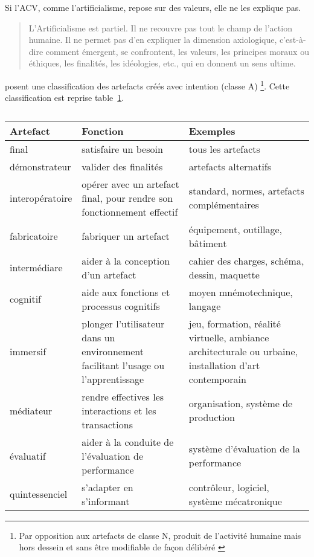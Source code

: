Si l'\gls{ACV}, comme l'artificialisme, repose sur des valeurs, elle ne les explique pas.
\blockcquote[chapitre 3, p.51 3.4 Propositions clefs de l'Artificialisme]{micaelli_artificialisme:_2003}{
L'Artificialisme est partiel.
Il ne recouvre pas tout le champ de l'action humaine.
Il ne permet pas d'en expliquer la dimension axiologique, c'est-à-dire comment émergent, se confrontent, les valeurs, les principes moraux ou éthiques, les finalités, les idéologies, etc., qui en donnent un sens ultime.
}

\citeauthor{micaelli_artificialisme:_2003} posent une classification des artefacts créés avec intention (classe A)
\footnote{Par opposition aux artefacts de classe N, produit de l'activité humaine mais hors dessein et sans être modifiable de façon délibéré \cite[p.55 Chapitre 4]{micaelli_artificialisme:_2003}}.
Cette classification est reprise table~\ref{tab:artefactsdeclasseA}.
\begin{table}
	\centering
	\begin{tabular}{l|p{4.5cm}|p{4.5cm}}
		Artefact & Fonction & Exemples \\
		\hline
		final & satisfaire un besoin & tous les artefacts \\
		démonstrateur & valider des finalités & artefacts alternatifs \\
		interopératoire & opérer avec un artefact final, pour rendre son fonctionnement effectif & standard, normes, artefacts complémentaires \\
		fabricatoire & fabriquer un artefact & équipement, outillage, bâtiment \\
		intermédiare & aider à la conception d'un artefact & cahier des charges, schéma, dessin, maquette \\
		cognitif & aide aux fonctions et processus cognitifs & moyen mnémotechnique, langage \\
		immersif & plonger l'utilisateur dans un environnement facilitant l'usage ou l'apprentissage & jeu, formation, réalité virtuelle, ambiance architecturale ou urbaine, installation d'art contemporain \\
		médiateur & rendre effectives les interactions et les transactions & organisation, système de production \\
		évaluatif & aider à la conduite de l'évaluation de performance & système d'évaluation de la performance \\
		quintessenciel & s'adapter en s'informant & contrôleur, logiciel, système mécatronique
	\end{tabular}
	\caption{\cite[Table 4.3, p.77 Typologie des artefacts de classe A]{micaelli_artificialisme:_2003}}
	\label{tab:artefactsdeclasseA}
\end{table}
